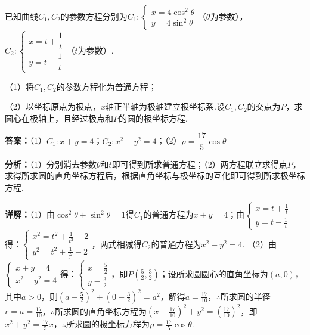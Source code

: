 \begin{question}[points=10]
已知曲线$C_1,C_2$的参数方程分别为$C_1:\begin{cases}x=4\cos^2\theta\\y=4\sin^2\theta\end{cases}$（$\theta$为参数），$C_2:\begin{cases}x=t+\dfrac1t\\y=t-\dfrac1t\end{cases}$（$t$为参数）.

（1）将$C_1,C_2$的参数方程化为普通方程；

（2）以坐标原点为极点，$x$轴正半轴为极轴建立极坐标系.设$C_1,C_2$的交点为$P$，求圆心在极轴上，且经过极点和$P$的圆的极坐标方程.
\begin{solution}
\textbf{答案：}（1）$C_1:x+y=4$；$C_2:x^2-y^2=4$；（2）$\rho=\dfrac{17}{5}\cos\theta$

\textbf{分析：}（1）分别消去参数$\theta$和$t$即可得到所求普通方程；（2）两方程联立求得点$P$，求得所求圆的直角坐标方程后，根据直角坐标与极坐标的互化即可得到所求极坐标方程.

\textbf{详解：}（1）由$\cos^2\theta+\sin^2\theta=1$得$C_1$的普通方程为$x+y=4$；由$\begin{cases}x=t+\frac1t\\y=t-\frac1t\end{cases}$得：$\begin{cases}x^2=t^2+\frac1{t^2}+2\\y^2=t^2+\frac1{t^2}-2\end{cases}$，两式相减得$C_2$的普通方程为$x^2-y^2=4$.
（2）由$\begin{cases}x+y=4\\x^2-y^2=4\end{cases}$得：$\begin{cases}x=\frac52\\y=\frac32\end{cases}$，即$P(\frac52,\frac32)$；设所求圆圆心的直角坐标为$(a,0)$，其中$a>0$，则$(a-\frac52)^2+(0-\frac32)^2=a^2$，解得$a=\frac{17}{10}$，$\therefore$所求圆的半径$r=a=\frac{17}{10}$，$\therefore$所求圆的直角坐标方程为$(x-\frac{17}{10})^2+y^2=(\frac{17}{10})^2$，即$x^2+y^2=\frac{17}{5}x$，$\therefore$所求圆的极坐标方程为$\rho=\frac{17}{5}\cos\theta$.
\end{solution}
\end{question}


